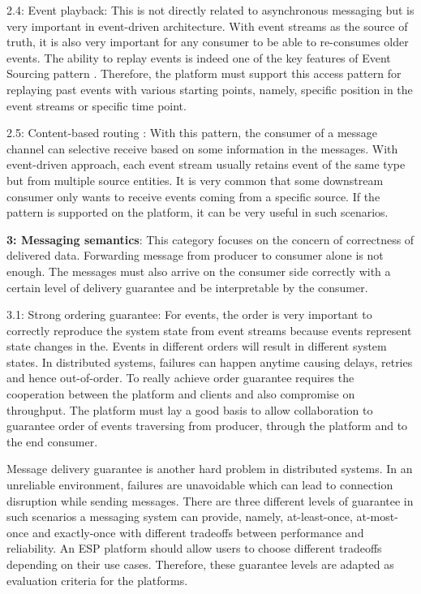 2.4: Event playback: This is not directly related to asynchronous messaging but is very important in event-driven architecture. With event streams as the source of truth, it is also very important for any consumer to be able to re-consumes older events. The ability to replay events is indeed one of the key features of Event Sourcing pattern \cite{eventsourcingfowler}. Therefore, the platform must support this access pattern for replaying past events with various starting points, namely, specific position in the event streams or specific time point.

2.5: Content-based routing \cite{messagingcontainedbasedrouter}: 
With this pattern, the consumer of a message channel can selective receive based on some information in the messages. With event-driven approach, each event stream usually retains event of the same type but from multiple source entities. It is very common that some downstream consumer only wants to receive events coming from a specific source. If the pattern is supported on the platform, it can be very useful in such scenarios. 

\textbf{3: Messaging semantics}: This category focuses on the concern of correctness of delivered data. Forwarding message from producer to consumer alone is not enough. The messages must also arrive on the consumer side correctly with a certain level of delivery guarantee and be interpretable by the consumer. 

3.1: Strong ordering guarantee: For events, the order is very important to correctly reproduce the system state from event streams because events represent state changes in the. Events in different orders will result in different system states. In distributed systems, failures can happen anytime causing delays, retries and hence out-of-order. To really achieve order guarantee requires the cooperation between the platform and clients and also compromise on throughput. The platform must lay a good basis to allow collaboration to guarantee order of events traversing from producer, through the platform and to the end consumer.

Message delivery guarantee is another hard problem in distributed systems. In an unreliable environment, failures are unavoidable which can lead to connection disruption while sending messages. There are three different levels of guarantee in such scenarios a messaging system can provide, namely, at-least-once, at-most-once and exactly-once with different tradeoffs between performance and reliability. An ESP platform should allow users to choose different tradeoffs depending on their use cases. Therefore, these guarantee levels are adapted as evaluation criteria for the platforms.

